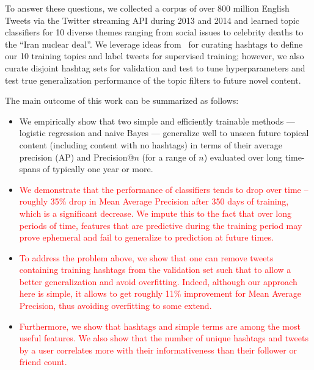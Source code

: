 To answer these questions, we collected a corpus of over 800 million English Tweets via the Twitter streaming API during 2013 and 2014 and learned topic classifiers for 10 diverse themes ranging from social issues to celebrity deaths to the ``Iran nuclear deal''.  We leverage ideas from~\cite{lin2011smoothing} for curating hashtags to define our 10 training topics and label tweets for supervised training; however, we also curate disjoint hashtag sets for validation and test to tune hyperparameters and test true generalization performance of the topic filters to future novel content. 

The main outcome of this work can be summarized as follows:
\begin{itemize}
    \item We empirically show that two simple and efficiently trainable methods --- logistic regression and naive Bayes --- generalize well to unseen future topical content (including content with no hashtags) in terms of their average precision (AP) and Precision@$n$ (for a range of $n$) evaluated over long time-spans of typically one year or more.
    \item \textcolor{red}{We demonstrate that the performance of classifiers tends to drop over time -- roughly 35\% drop in Mean Average Precision after 350 days of training, which is a significant decrease. We impute this to the fact that over long periods of time, features that are predictive during the training period may prove ephemeral and fail to generalize to prediction at future times. }
    \item \textcolor{red}{To address the problem above, we show that one can remove tweets containing training hashtags from the validation set such that to allow a better generalization and avoid overfitting. Indeed, although our approach here is simple, it allows to get roughly 11\% improvement for Mean Average Precision, thus avoiding overfitting to some extend.}
    \item \textcolor{red}{Furthermore, we show that hashtags and simple terms are among the most useful features.  We also show that the number of unique hashtags and tweets by a user correlates more with their informativeness than their follower or friend count. } 
\end{itemize}
  


